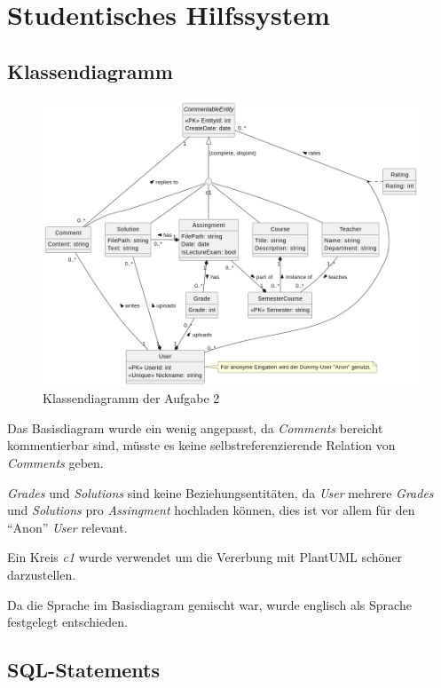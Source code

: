 \documentclass[12pt]{scrartcl}
\begin{document}
\section{Studentisches Hilfssystem}
\subsection{Klassendiagramm}

\begin{figure}[ht]
    \centering
    \includegraphics[width=0.9\linewidth]{../UE1_2.png}
    \caption{Klassendiagramm der Aufgabe 2}
\end{figure}

Das Basisdiagram wurde ein wenig angepasst, da \emph{Comments} bereicht kommentierbar sind,
müsste es keine selbstreferenzierende Relation von \emph{Comments} geben.\par

\emph{Grades} und \emph{Solutions} sind keine Beziehungsentitäten,
da \emph{User} mehrere \emph{Grades} und \emph{Solutions} pro \emph{Assingment} hochladen können,
dies ist vor allem für den \enquote{Anon} \emph{User} relevant.\par

Ein Kreis \emph{c1} wurde verwendet um die Vererbung mit PlantUML schöner darzustellen.\par

Da die Sprache im Basisdiagram gemischt war, wurde englisch als Sprache festgelegt entschieden.
\pagebreak

\subsection{SQL-Statements}
\inputminted{sql}{../UE1_2.sql}
\pagebreak
\end{document}
